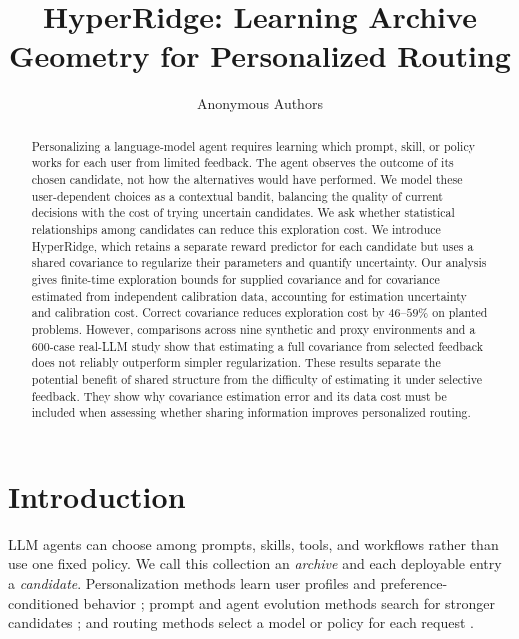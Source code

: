 \documentclass{article} %
\title{HyperRidge: Learning Archive Geometry for Personalized Routing}
\author{Anonymous Authors}
\begin{document}
\allowdisplaybreaks[3]

\maketitle

\begin{abstract}
Personalizing a language-model agent requires learning which prompt, skill,
or policy works for each user from limited feedback. The agent observes the
outcome of its chosen candidate, not how the alternatives would have
performed. We model these user-dependent choices as a contextual bandit,
balancing the quality of current decisions with the cost of trying
uncertain candidates. We ask whether statistical relationships among candidates can
reduce this exploration cost. We introduce HyperRidge, which retains a
separate reward predictor for each candidate but uses a shared covariance
to regularize their parameters and quantify uncertainty. Our analysis gives
finite-time exploration bounds for supplied covariance and for covariance
estimated from independent calibration data, accounting for estimation
uncertainty and calibration cost. Correct covariance reduces exploration
cost by $46$--$59\%$ on planted problems. However, comparisons across nine
synthetic and proxy environments and a $600$-case real-LLM study show that
estimating a full covariance from selected feedback does not reliably
outperform simpler regularization. These results separate the potential
benefit of shared structure from the difficulty of estimating it under
selective feedback. They show why covariance estimation error and its data
cost must be included when assessing whether sharing information improves
personalized routing.
\end{abstract}

\section{Introduction}

\label{sec:intro}

LLM agents can choose among prompts, skills, tools, and workflows rather than use one fixed policy. We call this collection an \emph{archive} and each deployable entry a \emph{candidate}. Personalization methods learn user profiles and preference-conditioned behavior \citep{salemi2023lamp,zhao2025prefeval,jin2026personalizing}; prompt and agent evolution methods search for stronger candidates \citep{fernando2023promptbreeder,guo2024evoprompt,zhou2024symbolic,agrawal2025geparp}; and routing methods select a model or policy for each request \citep{ong2024routellm,hu2024routerbench,li2025llmbandit,tsai2026neuralucb}.
\end{document}
